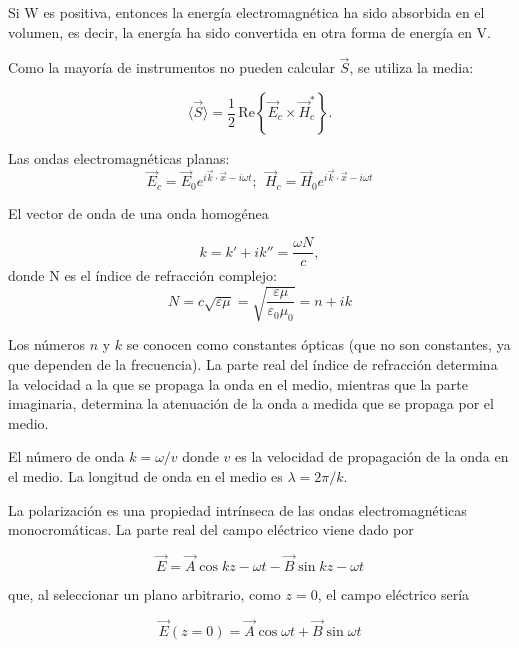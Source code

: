 \documentclass{article}
\begin{document}
Si W es positiva, entonces la energía electromagnética ha sido absorbida en el volumen, es decir, la energía ha sido convertida en otra forma de energía en V.

Como la mayoría de instrumentos no pueden calcular $\vec S$, se utiliza la media:

\begin{equation}
    \langle \vec{S} \rangle = \frac{1}{2} \, \text{Re}\!\left\{ \vec{E}_c \times \vec{H}^*_c \right\}.
\end{equation}

Las ondas electromagnéticas planas:
\begin{equation}
    \vec E_c = \vec E_0 e^{i\vec k \cdot \vec x-i\omega t}; \ \ \vec H_c = \vec H_0 e^{i\vec k \cdot \vec x-i\omega t}
\end{equation}

El vector de onda de una onda homogénea

\begin{equation}
    k = k' + ik'' = \frac{\omega N}{c},
\end{equation}
donde N es el índice de refracción complejo:
\begin{equation}
    N = c\sqrt{\varepsilon\mu} = \sqrt{\frac{\varepsilon\mu}{\varepsilon_0 \mu_0}} = n + ik
\end{equation}

Los números $n$ y $k$ se conocen como constantes ópticas (que no son constantes, ya que dependen de la frecuencia). La parte real del índice de refracción determina la velocidad a la que se propaga la onda en el medio, mientras que la parte imaginaria, determina la atenuación de la onda a medida que se propaga por el medio.

El número de onda $k = \omega/v$ donde $v$ es la velocidad de propagación de la onda en el medio.
La longitud de onda en el medio es $\lambda = 2\pi/k$.



La polarización es una propiedad intrínseca de las ondas electromagnéticas monocromáticas. La parte real del campo eléctrico viene dado por

\begin{equation}
    \vec E = \vec A \cos{kz - \omega t} - \vec B \sin{kz -\omega t}
\end{equation}

que, al seleccionar un plano arbitrario, como $z = 0$, el campo eléctrico sería

\begin{equation}
    \vec E(z=0) = \vec A \cos \omega t + \vec B \sin \omega t
\end{equation}
\end{document}

